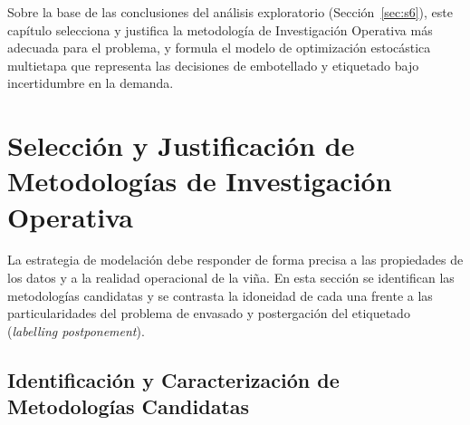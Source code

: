 Sobre la base de las conclusiones del análisis exploratorio (Sección~\ref{sec:s6}), este capítulo selecciona y justifica la metodología de Investigación Operativa más adecuada para el problema, y formula el modelo de optimización estocástica multietapa que representa las decisiones de embotellado y etiquetado bajo incertidumbre en la demanda.

\section{Selección y Justificación de Metodologías de Investigación Operativa\label{sec:s7}}

La estrategia de modelación debe responder de forma precisa a las propiedades de los datos y a la realidad operacional de la viña. En esta sección se identifican las metodologías candidatas y se contrasta la idoneidad de cada una frente a las particularidades del problema de envasado y postergación del etiquetado (\textit{labelling postponement}).

\subsection{Identificación y Caracterización de Metodologías Candidatas}


